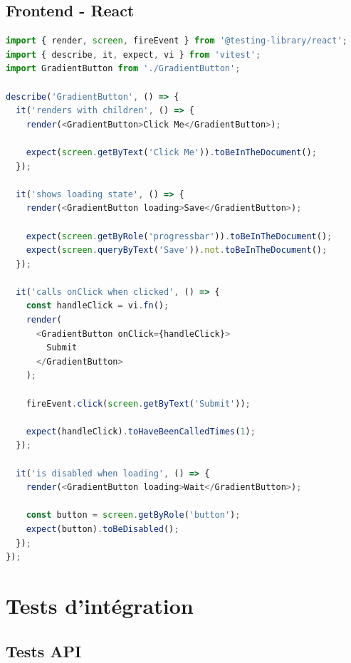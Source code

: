 \subsection{Frontend - React}

\begin{lstlisting}[language=JavaScript, caption=Exemple de test - GradientButton.test.jsx]
import { render, screen, fireEvent } from '@testing-library/react';
import { describe, it, expect, vi } from 'vitest';
import GradientButton from './GradientButton';

describe('GradientButton', () => {
  it('renders with children', () => {
    render(<GradientButton>Click Me</GradientButton>);
    
    expect(screen.getByText('Click Me')).toBeInTheDocument();
  });

  it('shows loading state', () => {
    render(<GradientButton loading>Save</GradientButton>);
    
    expect(screen.getByRole('progressbar')).toBeInTheDocument();
    expect(screen.queryByText('Save')).not.toBeInTheDocument();
  });

  it('calls onClick when clicked', () => {
    const handleClick = vi.fn();
    render(
      <GradientButton onClick={handleClick}>
        Submit
      </GradientButton>
    );
    
    fireEvent.click(screen.getByText('Submit'));
    
    expect(handleClick).toHaveBeenCalledTimes(1);
  });

  it('is disabled when loading', () => {
    render(<GradientButton loading>Wait</GradientButton>);
    
    const button = screen.getByRole('button');
    expect(button).toBeDisabled();
  });
});
\end{lstlisting}

\section{Tests d'intégration}

\subsection{Tests API}

